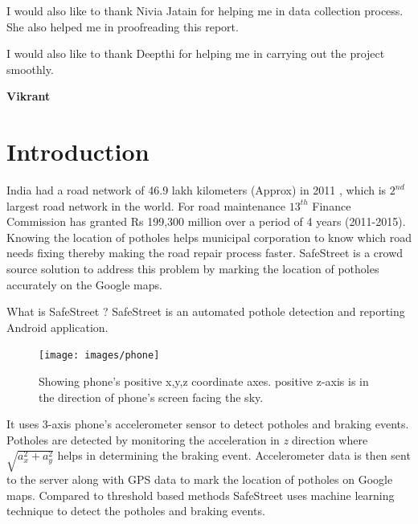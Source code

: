 \documentclass[12pt]{report}
\begin{document}
I would also like to thank Nivia Jatain for helping me in data collection
process. She also helped me in proofreading this report.

I would also like to thank Deepthi for helping me in carrying out the project
smoothly.


\vspace*{15px}
\begin{flushright} {\textbf{Vikrant}}
\end{flushright}


\tableofcontents

\setcounter{page}{1} 

\chapter{Introduction}
\label{sec:introduction_sec}
India had a road network of 46.9 lakh kilometers (Approx) in 2011 \cite[]{nhdp},
which is $2^{nd}$ \cite[]{cia}largest road network in the world. For road maintenance
$13^{th}$ Finance Commission has granted Rs 199,300 million \cite[]{rural_roads}
over a period of 4 years (2011-2015). Knowing the location of potholes helps
municipal corporation to know which road needs fixing thereby making the
road repair process faster. SafeStreet is a crowd source solution to address
this problem by marking the location of potholes accurately on the Google maps.

What is SafeStreet ? SafeStreet is an automated pothole detection and reporting
Android application\cite[]{safestreet_app}.
\begin{figure}[h]
  \centering
  \texttt{[image: images/phone]}
  \caption{Showing phone's positive x,y,z coordinate axes. positive z-axis is in
    the direction of phone's screen facing the sky. }
  \label{phone_axes}
\end{figure}

It uses 3-axis phone's accelerometer sensor to detect potholes and braking
events. Potholes are detected by monitoring the acceleration in \textit{z}
direction where $\sqrt{a_{x}^{2} + a_{y}^{2}}$ helps in determining the braking
event. Accelerometer data is then sent to the server along with GPS data to mark the
location of potholes on Google maps. Compared to threshold based methods
\cite[]{mohan2008nericell} SafeStreet uses machine learning technique to detect
the potholes and braking events.
\end{document}
